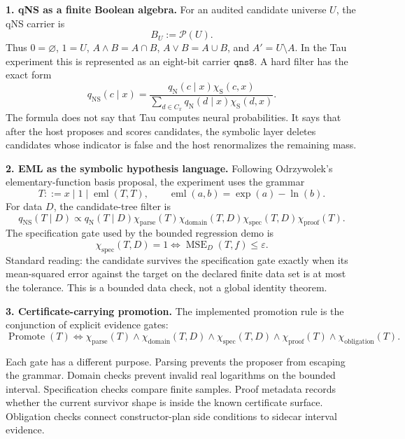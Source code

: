 \documentclass[10pt]{article}
\begin{document}
\textbf{1. qNS as a finite Boolean algebra.}
For an audited candidate universe \(U\), the qNS carrier is
\[
B_U:=\mathcal{P}(U).
\]
Thus \(0=\varnothing\), \(1=U\), \(A\wedge B=A\cap B\),
\(A\vee B=A\cup B\), and \(A'=U\setminus A\). In the Tau experiment this is
represented as an eight-bit carrier \(\mathtt{qns8}\). A hard filter has the
exact form
\[
q_{\mathrm{NS}}(c\mid x)
=
\frac{
q_{\mathrm{N}}(c\mid x)\chi_{\mathrm{S}}(c,x)
}{
\sum_{d\in C_x}q_{\mathrm{N}}(d\mid x)\chi_{\mathrm{S}}(d,x)
}.
\]
The formula does not say that Tau computes neural probabilities. It says that
after the host proposes and scores candidates, the symbolic layer deletes
candidates whose indicator is false and the host renormalizes the remaining
mass.

\textbf{2. EML as the symbolic hypothesis language.}
Following Odrzywolek's elementary-function basis proposal, the experiment uses
the grammar
\[
T ::= x \mid 1 \mid \operatorname{eml}(T,T),
\qquad
\operatorname{eml}(a,b)=\exp(a)-\ln(b).
\]
For data \(D\), the candidate-tree filter is
\[
q_{\mathrm{NS}}(T\mid D)
\propto
q_{\mathrm{N}}(T\mid D)
\chi_{\mathrm{parse}}(T)
\chi_{\mathrm{domain}}(T,D)
\chi_{\mathrm{spec}}(T,D)
\chi_{\mathrm{proof}}(T).
\]
The specification gate used by the bounded regression demo is
\[
\chi_{\mathrm{spec}}(T,D)=1
\Longleftrightarrow
\operatorname{MSE}_{D}(T,f)\le \varepsilon.
\]
Standard reading: the candidate survives the specification gate exactly when
its mean-squared error against the target on the declared finite data set is at
most the tolerance. This is a bounded data check, not a global identity theorem.

\textbf{3. Certificate-carrying promotion.}
The implemented promotion rule is the conjunction of explicit evidence gates:
\[
\operatorname{Promote}(T)
\Longleftrightarrow
\chi_{\mathrm{parse}}(T)\wedge
\chi_{\mathrm{domain}}(T,D)\wedge
\chi_{\mathrm{spec}}(T,D)\wedge
\chi_{\mathrm{proof}}(T)\wedge
\chi_{\mathrm{obligation}}(T).
\]
\vspace{-0.4em}
\begin{center}
\end{center}
\vspace{-0.7em}
Each gate has a different purpose. Parsing prevents the proposer from escaping
the grammar. Domain checks prevent invalid real logarithms on the bounded
interval. Specification checks compare finite samples. Proof metadata records
whether the current survivor shape is inside the known certificate surface.
Obligation checks connect constructor-plan side conditions to sidecar interval
evidence.
\end{document}
